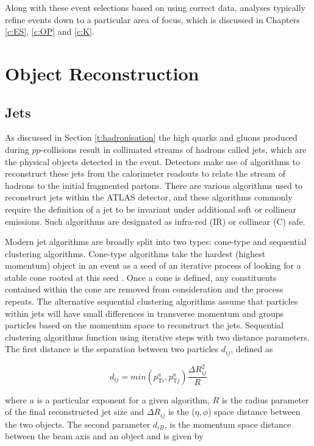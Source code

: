 	Along with these event selections based on using correct data, analyses typically refine events down to a particular area of focus, which is discussed in Chapters \ref{c:ES}, \ref{c:OP} and \ref{c:K}.

\section{Object Reconstruction}

	\subsection{Jets}
	\label{d:jetreco}

	As discussed in Section \ref{t:hadronisation} the high \pt quarks and gluons produced during $pp$-collisions result in collimated streams of hadrons called jets, which are the physical objects detected in the event. Detectors make use of algorithms to reconstruct these jets from the calorimeter readouts to relate the stream of hadrons to the initial fragmented partons. There are various algorithms used to reconstruct jets within the ATLAS detector, and these algorithms commonly require the definition of a jet to be invariant under additional soft or collinear emissions. Such algorithms are designated as infra-red (IR) or collinear (C) safe.

	Modern jet algorithms are broadly split into two types: cone-type and sequential clustering algorithms. Cone-type algorithms take the hardest (highest momentum) object in an event as a seed of an iterative process of looking for a stable cone rooted at this seed \cite{cone-type}. Once a cone is defined, any constituents contained within the cone are removed from consideration and the process repeats. The alternative sequential clustering algorithms assume that particles within jets will have small differences in transverse momentum and groups particles based on the momentum space to reconstruct the jets. Sequential clustering algorithms function using iterative steps with two distance parameters. The first distance is the separation between two particles $d_{ij}$, defined as

	\begin{equation}
		d_{ij} = min(p_{\text{T}i}^a, p_{\text{T}j}^a)\frac{\Delta R_{ij}^2}{R}
	\end{equation}

	where $a$ is a particular exponent for a given algorithm, $R$ is the radius parameter of the final reconstructed jet size and $\Delta R_{ij}$ is the ($\eta, \phi$) space distance between the two objects. The second parameter $d_{iB}$, is the momentum space distance between the beam axis and an object \cite{jetreco} and is given by

